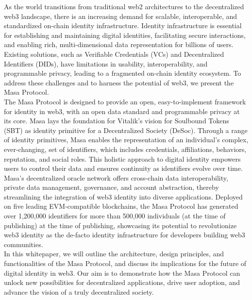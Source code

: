 \documentclass{article}
\begin{document}
As the world transitions from traditional web2 architectures to the decentralized web3 landscape, there is an increasing demand for scalable, interoperable, and standardized on-chain identity infrastructure. Identity infrastructure is essential for establishing and maintaining digital identities, facilitating secure interactions, and enabling rich, multi-dimensional data representation for billions of users. Existing solutions, such as Verifiable Credentials (VCs) and Decentralized Identifiers (DIDs), have limitations in usability, interoperability, and programmable privacy, leading to a fragmented on-chain identity ecosystem. To address these challenges and to harness the potential of web3, we present the Masa Protocol.
\\
\newline
The Masa Protocol is designed to provide an open, easy-to-implement framework for identity in web3, with an open data standard and programmable privacy at its core. Masa lays the foundation for Vitalik’s vision for Soulbound Tokens (SBT) as identity primitive for a Decentralized Society (DeSoc)\cite{vitalik2022}. Through a range of identity primitives, Masa enables the representation of an individual's complex, ever-changing, set of identifiers, which includes credentials, affiliations, behaviors, reputation, and social roles. This holistic approach to digital identity empowers users to control their data and ensures continuity as identifiers evolve over time.
\\
\newline
Masa's decentralized oracle network offers cross-chain data interoperability, private data management, governance, and account abstraction, thereby streamlining the integration of web3 identity into diverse applications. Deployed on five leading EVM-compatible blockchains, the Masa Protocol has generated over 1,200,000 identifiers for more than 500,000 individuals (at the time of publishing) at the time of publishing, showcasing its potential to revolutionize web3 identity as the de-facto identity infrastructure for developers building web3 communities.
\\
\newline
In this whitepaper, we will outline the architecture, design principles, and functionalities of the Masa Protocol, and discuss its implications for the future of digital identity in web3. Our aim is to demonstrate how the Masa Protocol can unlock new possibilities for decentralized applications, drive user adoption, and advance the vision of a truly decentralized society.
\end{document}
